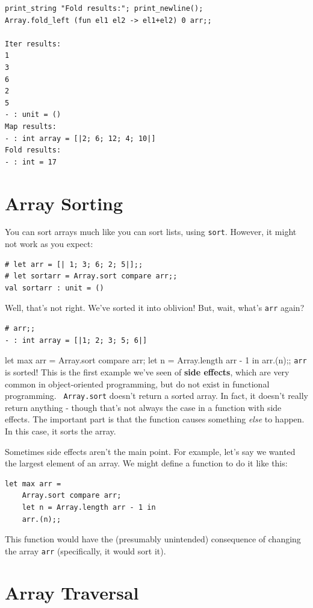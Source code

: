\documentclass[10pt]{book}
\begin{document}
{\begin{verbatim}
print_string "Fold results:"; print_newline();
Array.fold_left (fun el1 el2 -> el1+el2) 0 arr;;

Iter results:
1
3
6
2
5
- : unit = ()
Map results:
- : int array = [|2; 6; 12; 4; 10|]
Fold results:
- : int = 17
\end{verbatim}
\afterverb

\section{Array Sorting}

You can sort arrays much like you can sort lists, using
{\tt sort}. However, it might not work as you expect:

\beforeverb
\begin{verbatim}
# let arr = [| 1; 3; 6; 2; 5|];;
# let sortarr = Array.sort compare arr;;
val sortarr : unit = ()
\end{verbatim}
\afterverb
Well, that's not right. We've sorted it into oblivion! 
But, wait, what's {\tt arr} again?

\beforeverb
\begin{verbatim}
# arr;;
- : int array = [|1; 2; 3; 5; 6|]
\end{verbatim}
\afterverb
let max arr = 
	Array.sort compare arr;
	let n = Array.length arr - 1 in 	
	arr.(n);;
{\tt arr} is sorted! This is the first example we've seen of 
{\bf side effects}, which are very common in object-oriented 
programming, but do not exist in functional programming. {\tt 
Array.sort} doesn't return a sorted array. In fact, it doesn't
really return anything - though that's not always the case in 
a function with side effects. The important part is that the 
function causes something {\it else} to happen. In this case, 
it sorts the array.

Sometimes side effects aren't the main point. For example, let's
say we wanted the largest element of an array. We might define a 
function to do it like this: 

\beforeverb
\begin{verbatim}
let max arr = 
	Array.sort compare arr;
	let n = Array.length arr - 1 in 	
	arr.(n);;
\end{verbatim}
\afterverb

This function would have the (presumably unintended) consequence of
changing the array {\tt arr} (specifically, it would sort it).

\section{Array Traversal}

}
\end{document}
